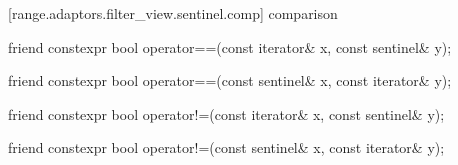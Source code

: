 \begin{itemdescr}
\pnum
\oldtxt{\returns}  
\end{itemdescr}

[range.adaptors.filter_view.sentinel.comp]{ comparison}

%
\begin{itemdecl}
friend constexpr bool operator==(const iterator& x, const sentinel& y);
\end{itemdecl}

\begin{itemdescr}
\pnum
\oldtxt{\returns} 
\end{itemdescr}

%
\begin{itemdecl}
friend constexpr bool operator==(const sentinel& x, const iterator& y);
\end{itemdecl}

\begin{itemdescr}
\pnum
\oldtxt{\returns} 
\end{itemdescr}

%
\begin{itemdecl}
friend constexpr bool operator!=(const iterator& x, const sentinel& y);
\end{itemdecl}

\begin{itemdescr}
\pnum
\oldtxt{\returns} 
\end{itemdescr}

%
\begin{itemdecl}
friend constexpr bool operator!=(const sentinel& x, const iterator& y);
\end{itemdecl}

\begin{itemdescr}
\pnum
\oldtxt{\returns} 
\end{itemdescr}


